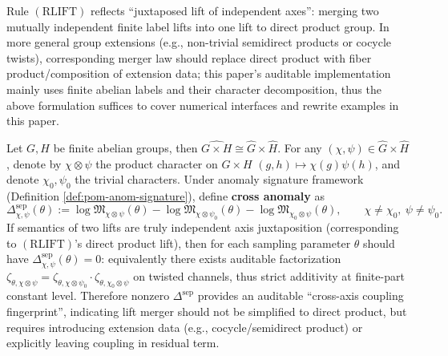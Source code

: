 \begin{remark}\label{rem:pom-rlift-scope}
Rule \((\mathrm{RLIFT})\) reflects ``juxtaposed lift of independent axes'': merging two mutually independent finite label lifts into one lift to direct product group.
In more general group extensions (e.g., non-trivial semidirect products or cocycle twists), corresponding merger law should replace direct product with fiber product/composition of extension data; this paper's auditable implementation mainly uses finite abelian labels and their character decomposition, thus the above formulation suffices to cover numerical interfaces and rewrite examples in this paper.
\end{remark}

\begin{remark}\label{rem:pom-rlift-cross-anom-test}
Let \(G,H\) be finite abelian groups, then \(\widehat{G\times H}\cong\widehat G\times\widehat H\).
For any \((\chi,\psi)\in\widehat G\times\widehat H\), denote by \(\chi\otimes\psi\) the product character on \(G\times H\)
\((g,h)\mapsto \chi(g)\psi(h)\), and denote \(\chi_0,\psi_0\) the trivial characters.
Under anomaly signature framework (Definition \ref{def:pom-anom-signature}), define \textbf{cross anomaly} as
\[
\Delta^{\mathrm{sep}}_{\chi,\psi}(\theta)
:=
\log\mathfrak{M}_{\chi\otimes\psi}(\theta)
-\log\mathfrak{M}_{\chi\otimes\psi_0}(\theta)
-\log\mathfrak{M}_{\chi_0\otimes\psi}(\theta),
\qquad
\chi\neq\chi_0,\ \psi\neq\psi_0.
\]
If semantics of two lifts are truly independent axis juxtaposition (corresponding to \((\mathrm{RLIFT})\)'s direct product lift), then for each sampling parameter \(\theta\) should have
\(\Delta^{\mathrm{sep}}_{\chi,\psi}(\theta)=0\): equivalently there exists auditable factorization
\(\zeta_{\theta,\chi\otimes\psi}=\zeta_{\theta,\chi\otimes\psi_0}\cdot \zeta_{\theta,\chi_0\otimes\psi}\)
on twisted channels,
thus strict additivity at finite-part constant level.
Therefore nonzero \(\Delta^{\mathrm{sep}}\) provides an auditable ``cross-axis coupling fingerprint'', indicating lift merger should not be simplified to direct product, but requires introducing extension data (e.g., cocycle/semidirect product) or explicitly leaving coupling in residual term.
\end{remark}

